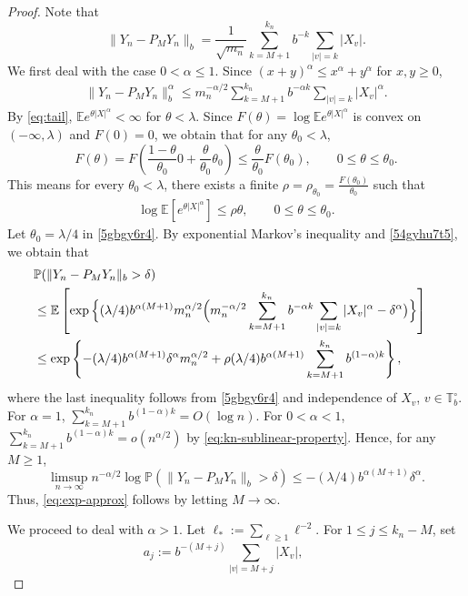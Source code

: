 \documentclass[a4paper, 11pt]{article}
\newcommand{\1}{\mathbf 1}
\theoremstyle{plain}
\begin{document}
\begin{proof}
Note that
\[
  \|Y_n-P_MY_n\|_b
  =
  \frac1{\sqrt{m_n}}
  \sum_{k=M+1}^{k_n}b^{-k}\sum_{|v|=k}|X_v|.
\]
We first deal with the case \(0<\alpha\leq1\). Since
\((x+y)^\alpha\leq x^\alpha+y^\alpha\) for \(x,y\geq0\),
\begin{align}\label{54gyhu7t5}
  \|Y_n-P_MY_n\|_b^\alpha
  \leq
  m_n^{-\alpha/2}
  \sum_{k=M+1}^{k_n}b^{-\alpha k}
  \sum_{|v|=k}|X_v|^\alpha .
\end{align}
By \eqref{eq:tail}, $\mathbb{E} e^{\theta|X|^\alpha}<\infty$ for \(\theta<\lambda\). Since \(F(\theta)=\log\mathbb{E} e^{\theta|X|^\alpha}\) is convex on $(-\infty,\lambda)$ and \(F(0)=0\), we obtain that for any $\theta_0<\lambda$,
\[
  F(\theta)=F\left(\frac{1-\theta}{\theta_0}0+\frac{\theta}{\theta_0}\theta_0\right)\leq\frac{\theta}{\theta_0}F(\theta_0),
  \qquad 0\leq\theta\leq\theta_0.
\]
This means for every \(\theta_0<\lambda\), there exists a finite
\(\rho=\rho_{\theta_0}=\frac{F(\theta_0)}{\theta_0}\) such that
\begin{align}\label{5gbgy6r4}
  \log\mathbb{E} [e^{\theta|X|^\alpha}]\leq  \rho\theta,
  \qquad 0\leq\theta\leq\theta_0.
\end{align}
Let
$\theta_0=\lambda/4$ in \eqref{5gbgy6r4}. By exponential Markov's inequality and \eqref{54gyhu7t5}, we obtain that
\begin{align}\label{4grtg6yr4}
  &\mathbb{P}(\|Y_n-P_MY_n\|_b>\delta)\cr
  &\leq
  \mathbb{E}\left[\exp\Big\{
(\lambda/4)b^{\alpha(M+1)}m_n^{\alpha/2}\Big(m_n^{-\alpha/2}
  \sum_{k=M+1}^{k_n}b^{-\alpha k}
  \sum_{|v|=k}|X_v|^\alpha-\delta^{\alpha}\big)\Big\}\right]\cr
&\leq\exp\left\{
    -(\lambda/4)b^{\alpha(M+1)}\delta^\alpha m_n^{\alpha/2}
    +\rho(\lambda/4)b^{\alpha(M+1)}\sum_{k=M+1}^{k_n}b^{(1-\alpha)k}
  \right\},
\end{align}
where the last inequality follows from \eqref{5gbgy6r4} and independence of $X_v$, $v\in\mathbb{T}_b^\circ$. For \(\alpha=1\), \(\sum_{k=M+1}^{k_n}b^{(1-\alpha)k}=O(\log n)\). For \(0<\alpha<1\),
\(\sum_{k=M+1}^{k_n}b^{(1-\alpha)k}=o(n^{\alpha/2})\) by \eqref{eq:kn-sublinear-property}.  Hence, for any
\(M\geq1\),
\[
  \limsup_{n\to\infty}n^{-\alpha/2}
  \log\mathbb{P}(\|Y_n-P_MY_n\|_b>\delta)
  \leq-(\lambda/4)b^{\alpha(M+1)}\delta^\alpha .
\]
Thus, \eqref{eq:exp-approx} follows by letting $M\to\infty.$
\par
We proceed to deal with \(\alpha>1\). Let
$
  \ell_{*}:=\sum_{\ell\geq1}\ell^{-2}.
$
For \(1\leq j\leq k_n-M\), set
\[
  a_j:=b^{-(M+j)}
  \sum_{|v|=M+j}|X_v|,
  \qquad
\]
\end{proof}
\end{document}
